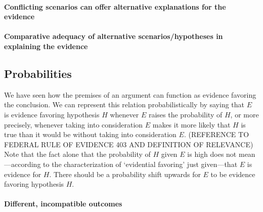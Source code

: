 \documentclass[10pt]{article}
\begin{document}




\paragraph{Conflicting scenarios can offer alternative explanations for the evidence}

\paragraph{Comparative adequacy of alternative scenarios/hypotheses in explaining the evidence}





\subsection{Probabilities}

We have seen how the premises of an argument can function as evidence favoring the conclusion. We can represent this relation 
probabilistically by saying that $E$ is evidence favoring hypothesis $H$ whenever $E$ raises the probability of $H$, or more precisely, whenever taking into consideration $E$ makes it more likely that $H$ is true than it would be without taking into consideration $E$. (REFERENCE TO FEDERAL RULE OF EVIDENCE 403 AND DEFINITION OF RELEVANCE)
Note that the fact alone that the probability of $H$ given $E$ is high does not mean---according to the characterization of `evidential favoring' just given---that 
$E$ is evidence for $H$. There should be a probability shift upwards for $E$ to be evidence favoring hypothesis $H$. 

\paragraph{Different, incompatible outcomes}
\end{document}
